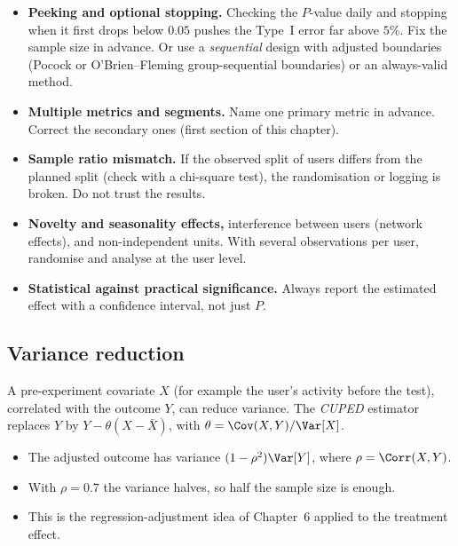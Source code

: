 \begin{itemize}
  \item \textbf{Peeking and optional stopping.} Checking the $P$-value daily and stopping when it first drops below $0.05$ pushes the Type~I error far above $5\%$. Fix the sample size in advance. Or use a \emph{sequential} design with adjusted boundaries (Pocock or O'Brien--Fleming group-sequential boundaries) or an always-valid method.
  \item \textbf{Multiple metrics and segments.} Name one primary metric in advance. Correct the secondary ones (first section of this chapter).
  \item \textbf{Sample ratio mismatch.} If the observed split of users differs from the planned split (check with a chi-square test), the randomisation or logging is broken. Do not trust the results.
  \item \textbf{Novelty and seasonality effects,} interference between users (network effects), and non-independent units. With several observations per user, randomise and analyse at the user level.
  \item \textbf{Statistical against practical significance.} Always report the estimated effect with a confidence interval, not just $P$.
\end{itemize}

\subsection{Variance reduction}

A pre-experiment covariate $X$ (for example the user's activity before the test), correlated with the outcome $Y$, can reduce variance. The \emph{CUPED} estimator replaces $Y$ by $Y-\theta(X-\bar{X})$, with $\theta=\Cov(X,Y)/\Var[X]$.
\begin{itemize}
  \item The adjusted outcome has variance $(1-\rho^2)\Var[Y]$, where $\rho=\Corr(X,Y)$.
  \item With $\rho=0.7$ the variance halves, so half the sample size is enough.
  \item This is the regression-adjustment idea of Chapter~6 applied to the treatment effect.
\end{itemize}

